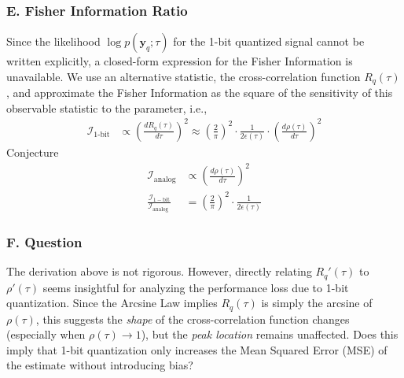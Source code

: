 \documentclass{article}
\begin{document}
	\subsubsection*{E. Fisher Information Ratio}
	Since the likelihood $\log p(\mathbf{y}_q; \tau)$ for the 1-bit quantized signal cannot be written explicitly, a closed-form expression for the Fisher Information is unavailable. We use an alternative statistic, the cross-correlation function $R_q(\tau)$, and approximate the Fisher Information as the square of the sensitivity of this observable statistic to the parameter, i.e.,
	\begin{align}
		\mathcal{I}_{\text{1-bit}} &\propto \left( \frac{dR_q(\tau)}{d\tau} \right)^2 \approx \left( \frac{2}{\pi} \right)^2 \cdot \frac{1}{2\epsilon(\tau)} \cdot \left( \frac{d\rho(\tau)}{d\tau} \right)^2 
	\end{align}
	Conjecture
	\begin{align}
		\mathcal{I}_{\text{analog}} &\propto \left( \frac{d\rho(\tau)}{d\tau} \right)^2 \\
		\frac{\mathcal{I}_{1-\mathrm{bit}}}{\mathcal{I}_{\text {analog }}}&=\left(\frac{2}{\pi}\right)^{2} \cdot \frac{1}{2 \epsilon(\tau)} 
	\end{align}
	
	\subsubsection*{F. Question}
	The derivation above is not rigorous. However, directly relating $R_q'(\tau)$ to $\rho'(\tau)$ seems insightful for analyzing the performance loss due to 1-bit quantization. Since the Arcsine Law implies $R_q(\tau)$ is simply the arcsine of $\rho(\tau)$, this suggests the \textit{shape} of the cross-correlation function changes (especially when $\rho(\tau) \to 1$), but the \textit{peak location} remains unaffected. Does this imply that 1-bit quantization only increases the Mean Squared Error (MSE) of the estimate without introducing bias?
	
	
\end{document}
